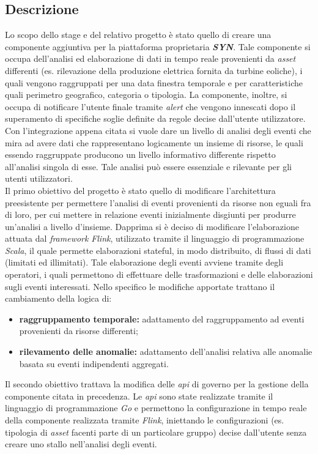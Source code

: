 \subsection{Descrizione}

Lo scopo dello stage e del relativo progetto è stato quello di creare una componente aggiuntiva per la piattaforma proprietaria \textbf{\textit{SYN}}. Tale componente si occupa dell'analisi ed elaborazione di dati in tempo reale provenienti da \textit{asset} differenti (es. rilevazione della produzione elettrica fornita da turbine eoliche), i quali vengono raggruppati per una data finestra temporale e per caratteristiche quali perimetro geografico, categoria o tipologia. La componente, inoltre,
si occupa di notificare l'utente finale tramite \textit{alert} che vengono innescati dopo il superamento di specifiche soglie definite da regole decise dall'utente utilizzatore.\\
Con l'integrazione appena citata si vuole dare un livello di analisi degli eventi che mira ad avere dati che rappresentano logicamente un insieme di risorse, le quali essendo raggruppate producono un livello informativo differente rispetto all'analisi singola di esse. Tale analisi può essere essenziale e rilevante per gli utenti utilizzatori.\\
Il primo obiettivo del progetto è stato quello di modificare l'architettura preesistente per permettere l'analisi di eventi provenienti da risorse non eguali fra di loro, per cui mettere in relazione eventi inizialmente disgiunti per produrre un'analisi a livello d'insieme. Dapprima si è deciso di modificare l'elaborazione attuata dal \textit{\gls{framework}} \textit{Flink}, utilizzato tramite il linguaggio di programmazione \textit{Scala}, il quale permette elaborazioni \gls{stateful}, in modo distribuito, di flussi di dati (limitati ed illimitati). Tale elaborazione degli eventi avviene tramite degli operatori, i quali permettono di effettuare delle trasformazioni e delle elaborazioni sugli eventi interessati. Nello specifico le modifiche apportate trattano il cambiamento della logica di:
\begin{itemize}
	\item{\textbf{raggruppamento temporale:} adattamento del raggruppamento ad eventi provenienti da risorse differenti;}
	\item{\textbf{rilevamento delle anomalie:} adattamento dell'analisi relativa alle anomalie basata su eventi indipendenti aggregati.}
\end{itemize}
Il secondo obiettivo trattava la modifica delle \textit{\gls{api}} di governo per la gestione della componente citata in precedenza. Le \textit{\gls{api}} sono state realizzate tramite il linguaggio di programmazione \textit{Go} e permettono la configurazione in tempo reale della componente realizzata tramite \textit{Flink}, iniettando le configurazioni (es. tipologia di \textit{asset} facenti parte di un particolare gruppo) decise dall'utente senza creare uno stallo nell'analisi degli eventi.

